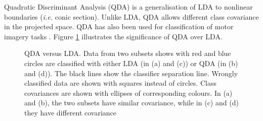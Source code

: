 Quadratic Discriminant Analysis (QDA) is a generalisation of LDA to nonlinear boundaries (\textit{i.e.} conic section). 
Unlike LDA, QDA allows different class covariance in the projected space. QDA has also been used for classification of motor imagery tasks \citep{bhattacharyya_performance_2010}. Figure \ref{fig:lda-qda} illustrates the significance of QDA over LDA. 
\begin{figure}[h!]
\centering
{}
\caption{QDA versus LDA.
Data from two subsets shows with red and blue circles are classified with either LDA (in (a) and (c)) or QDA (in (b) and (d)). The black lines show the classifier separation line. Wrongly classified data are shown with squares instead of circles. 
Class covariances are shown with ellipses of corresponding colours. 
In (a) and (b), the two subsets have similar covariance, while in (c) and (d) they have different covariance \citep{scikit-learn}}
\label{fig:lda-qda}
\end{figure}

